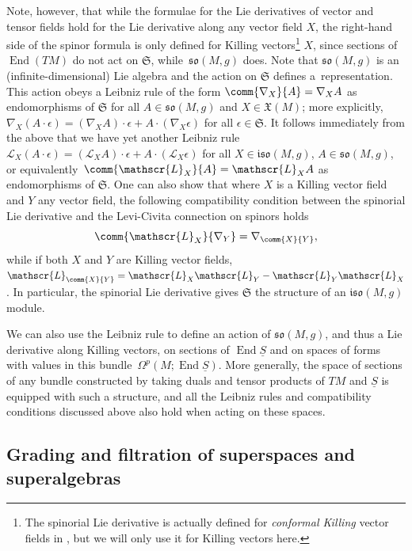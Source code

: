 \documentclass[10pt,a4paper]{amsart}
\numberwithin{equation}{section}
\newcommand{\fso}{\mathfrak{so}}
\newcommand{\fiso}{\mathfrak{iso}}
\newcommand{\fX}{\mathfrak{X}}
\newcommand{\fS}{\mathfrak{S}}
\newcommand{\eL}{\mathscr{L}}
\newcommand{\Sbundle}{\underline{S}}
\newcommand{\1}{\mathbbm{1}}
\DeclareMathOperator{\End}{End}
\begin{document}
Note, however, that while the formulae for the Lie derivatives of vector and tensor fields hold for the Lie derivative along any vector field $X$, the right-hand side of the spinor formula is only defined for Killing vectors\footnote{The spinorial Lie derivative is actually defined for \emph{conformal Killing} vector fields in \cite{Kosmann1971}, but we will only use it for Killing vectors here.}
$X$, since sections of $\End(TM)$ do not act on $\fS$, while~$\fso(M,g)$ does. Note that $\fso(M,g)$ is an (infinite-dimensional) Lie algebra and the action on $\fS$ defines a~representation. This action obeys a Leibniz rule of the form $\comm{\nabla_X}{A}=\nabla_X A$ as endomorphisms of $\fS$ for all $A\in\fso(M,g)$ and $X\in\fX(M)$; more explicitly,
$\nabla_X (A\cdot\epsilon) = (\nabla_X A)\cdot\epsilon + A\cdot(\nabla_X \epsilon)
$
for all $\epsilon\in\fS$. It follows immediately from the above that we have yet another Leibniz rule~${\eL_X (A\cdot\epsilon) = (\eL_X A)\cdot\epsilon + A\cdot(\eL_X \epsilon)
}$
for all $X\in\fiso(M,g)$, $A\in\fso(M,g)$, or equivalently~${\comm{\eL_X}{A}=\eL_X A}$ as endomorphisms of $\fS$. One can also show that where $X$ is a Killing vector field and $Y$ any vector field, the following compatibility condition between the spinorial Lie derivative and the Levi-Civita connection on spinors holds
\begin{equation}\label{eq:lie-der-compat}
	\comm{\eL_X}{\nabla_Y} = \nabla_{\comm{X}{Y}},
\end{equation}
while if both $X$ and $Y$ are Killing vector fields,
$\eL_{\comm{X}{Y}} = \eL_X\eL_Y - \eL_Y\eL_X$.
In particular, the spinorial Lie derivative gives $\fS$ the structure of an $\fiso(M,g)$ module.

We can also use the Leibniz rule to define an action of $\fso(M,g)$, and thus a Lie derivative along Killing vectors, on sections of $\End\Sbundle$ and on spaces of forms with values in this bundle~$\Omega^p(M;\End\Sbundle)$. More generally, the space of sections of any bundle constructed by taking duals and tensor products of $TM$ and $\Sbundle$ is equipped with such a structure, and all the Leibniz rules and compatibility conditions discussed above also hold when acting on these spaces.


\subsection{Grading and filtration of superspaces and superalgebras}
\label{sec:grading-filtration-superspace}
\end{document}
